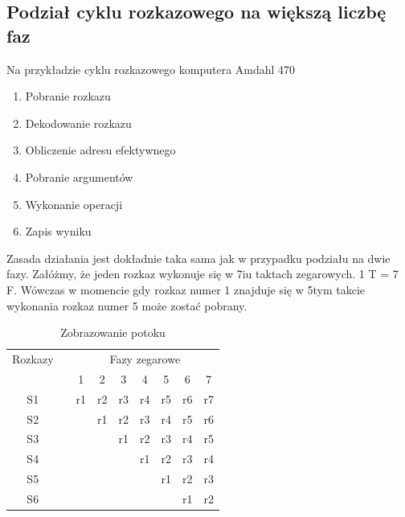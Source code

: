 \documentclass[a4paper,twoside]{article}
\begin{document}
    	\subsection*{Podział cyklu rozkazowego na większą liczbę faz}
    	Na przykładzie cyklu rozkazowego komputera Amdahl 470
    	\begin{enumerate}
    		\item Pobranie rozkazu
    		\item Dekodowanie rozkazu
    		\item Obliczenie adresu efektywnego
    		\item Pobranie argumentów
    		\item Wykonanie operacji
    		\item Zapis wyniku
    	\end{enumerate}
    	Zasada działania jest dokładnie taka sama jak w przypadku podziału na dwie fazy. Załóżmy, że jeden rozkaz wykonuje się w 7iu taktach zegarowych. 1 T = 7 F. Wówczas w momencie gdy rozkaz numer 1 znajduje się w 5tym takcie wykonania rozkaz numer 5 może zostać pobrany.
    	\begin{table}[htbp]
    		\centering
    		\caption{Zobrazowanie potoku}
    		\begin{tabular}{|r|r|r|r|r|r|r|r|r|}
    			\multicolumn{1}{r}{Rozkazy} & \multicolumn{1}{r}{} & \multicolumn{7}{c}{Fazy zegarowe} \\
    			\multicolumn{1}{r}{} & \multicolumn{1}{r}{} & \multicolumn{1}{c}{1} & \multicolumn{1}{c}{2} & \multicolumn{1}{c}{3} & \multicolumn{1}{c}{4} & \multicolumn{1}{c}{5} & \multicolumn{1}{c}{6} & \multicolumn{1}{c}{7} \bigstrut[b]\\
    			\cline{1-1}\cline{3-9}    \multicolumn{1}{|c|}{S1} &       & r1    & r2    & r3    & r4    & r5    & r6    & r7 \bigstrut\\
    			\cline{1-1}\cline{3-9}    \multicolumn{1}{|c|}{S2} &       &       & r1    & r2    & r3    & r4    & r5    & r6 \bigstrut\\
    			\cline{1-1}\cline{3-9}    \multicolumn{1}{|c|}{S3} &       &       &       & r1    & r2    & r3    & r4    & r5 \bigstrut\\
    			\cline{1-1}\cline{3-9}    \multicolumn{1}{|c|}{S4} &       &       &       &       & r1    & r2    & r3    & r4 \bigstrut\\
    			\cline{1-1}\cline{3-9}    \multicolumn{1}{|c|}{S5} &       &       &       &       &       & r1    & r2    & r3 \bigstrut\\
    			\cline{1-1}\cline{3-9}    \multicolumn{1}{|c|}{S6} &       &       &       &       &       &       & r1    & r2 \bigstrut\\
    			\cline{1-1}\cline{3-9}    \end{tabular}%
    		\label{tab:addlabel}%
    	\end{table}%
\end{document}
